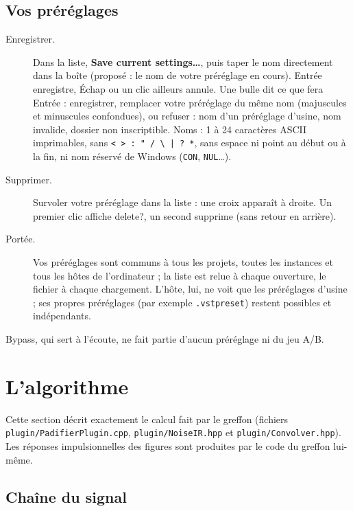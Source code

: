 \documentclass[a4paper,11pt]{article}
\newcommand{\ctl}[1]{\textsf{\textbf{#1}}}   %
\begin{document}
\subsection{Vos préréglages}
\begin{description}
\item[Enregistrer.] Dans la liste, \ctl{Save current settings\ldots}, puis taper le nom
  directement dans la boîte (proposé : le nom de votre préréglage en cours). \textsf{Entrée}
  enregistre, \textsf{Échap} ou un clic ailleurs annule. Une bulle dit ce que fera
  \textsf{Entrée} : enregistrer, remplacer votre préréglage du même nom (majuscules et minuscules
  confondues), ou refuser : nom d'un préréglage d'usine, nom invalide, dossier non inscriptible.
  Noms : 1 à 24 caractères ASCII imprimables, sans \verb+< > : " / \ | ? *+, sans espace ni point
  au début ou à la fin, ni nom réservé de Windows (\texttt{CON}, \texttt{NUL}\ldots).
\item[Supprimer.] Survoler votre préréglage dans la liste : une croix apparaît à droite. Un
  premier clic affiche \og delete?\fg, un second supprime (sans retour en arrière).
\item[Portée.] Vos préréglages sont communs à tous les projets, toutes les instances et tous les
  hôtes de l'ordinateur ; la liste est relue à chaque ouverture, le fichier à chaque chargement.
  L'hôte, lui, ne voit que les préréglages d'usine ; ses propres préréglages (par exemple
  \texttt{.vstpreset}) restent possibles et indépendants.
\end{description}
Bypass, qui sert à l'écoute, ne fait partie d'aucun préréglage ni du jeu A/B.

\section{L'algorithme}

Cette section décrit exactement le calcul fait par le greffon (fichiers
\nolinkurl{plugin/PadifierPlugin.cpp}, \nolinkurl{plugin/NoiseIR.hpp} et
\nolinkurl{plugin/Convolver.hpp}). Les réponses impulsionnelles des figures sont produites par le
code du greffon lui-même.

\subsection{Chaîne du signal}
\end{document}
